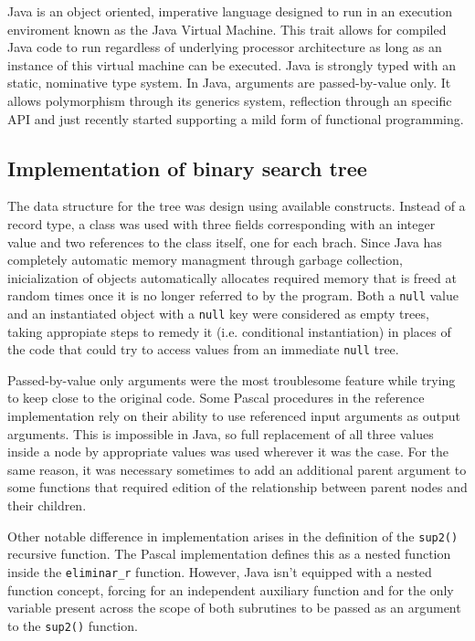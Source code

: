 \documentclass[11pt]{scrartcl} %
\begin{document}
Java is an object oriented, imperative language designed to run in an execution enviroment known as the Java Virtual Machine. This trait allows for compiled Java code to run regardless of underlying processor architecture as long as an instance of this virtual machine can be executed. Java is strongly typed with an static, nominative type system. In Java, arguments are passed-by-value only. It allows polymorphism through its generics system, reflection through an specific API and just recently started supporting a mild form of functional programming.

\subsection*{Implementation of binary search tree}

The data structure for the tree was design using available constructs. Instead of a record type, a class was used with three fields corresponding with an integer value and two references to the class itself, one for each brach. Since Java has completely automatic memory managment through garbage collection, inicialization of objects automatically allocates required memory that is freed at random times once it is no longer referred to by the program. Both a \texttt{null} value and an instantiated object with a \texttt{null} key were considered as empty trees, taking appropiate steps to remedy it (i.e. conditional instantiation) in places of the code that could try to access values from an immediate \texttt{null} tree.

Passed-by-value only arguments were the most troublesome feature while trying to keep close to the original code. Some Pascal procedures in the reference implementation rely on their ability to use referenced input arguments as output arguments. This is impossible in Java, so full replacement of all three values inside a node by appropriate values was used wherever it was the case. For the same reason, it was necessary sometimes to add an additional parent argument to some functions that required edition of the relationship between parent nodes and their children.

Other notable difference in implementation arises in the definition of the \texttt{sup2()} recursive function. The Pascal implementation defines this as a nested function inside the \texttt{eliminar\_r} function. However, Java isn't equipped with a nested function concept, forcing for an independent auxiliary function and for the only variable present across the scope of both subrutines to be passed as an argument to the \texttt{sup2()} function.
\end{document}
